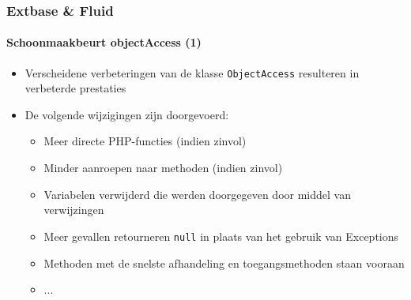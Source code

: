 
\begin{frame}[fragile]
	\frametitle{Extbase \& Fluid}
	\framesubtitle{Schoonmaakbeurt objectAccess (1)}

	\begin{itemize}

		\item Verscheidene verbeteringen van de klasse \texttt{ObjectAccess} resulteren in verbeterde prestaties
		\item De volgende wijzigingen zijn doorgevoerd:

			\begin{itemize}
				\item Meer directe PHP-functies (indien zinvol)
				\item Minder aanroepen naar methoden (indien zinvol)
				\item Variabelen verwijderd die werden doorgegeven door middel van verwijzingen
				\item Meer gevallen retourneren \texttt{null} in plaats van het gebruik van Exceptions
				\item Methoden met de snelste afhandeling en toegangsmethoden staan vooraan
				\item ...
			\end{itemize}

	\end{itemize}

\end{frame}


